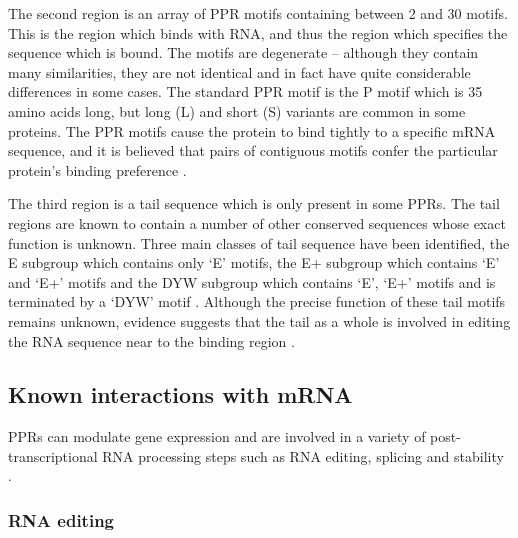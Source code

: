 The second region is an array of PPR motifs containing between 2 and
30 motifs.
This is the region which binds with RNA, and thus the region which specifies
the sequence which is bound.
The motifs are degenerate -- although they contain many similarities, they are
not identical and in fact have quite considerable differences in some cases.
The standard PPR motif is the P motif which is 35 amino acids long, 
but long (L) and short (S) variants are common in some proteins.
The PPR motifs cause the protein to bind tightly to a specific mRNA sequence,
and it is believed that pairs of contiguous motifs confer the particular
protein's binding preference \citep{Kobayashi2012}.

The third region is a tail sequence which is only present in some PPRs.
The tail regions are known to contain a number of other conserved sequences 
whose exact function is unknown.
Three main classes of tail sequence have been identified, 
the E subgroup which contains
only `E' motifs, the E+ subgroup which contains `E' and `E+' motifs and the DYW
subgroup which contains `E', `E+' motifs and is terminated by a `DYW' motif
\citep{Lurin2004}.
Although the precise function of these tail motifs remains unknown, 
evidence suggests that the tail as a whole is involved in editing the RNA
sequence near to the binding region \citep{Yagi2013a}.

\subsection{Known interactions with mRNA}

PPRs can modulate gene expression and are involved in a variety of
post-transcriptional RNA processing steps such as RNA editing, splicing and
stability \citep{Schmitz-Linneweber2008,Nakamura2012}.

\subsubsection{RNA editing}

